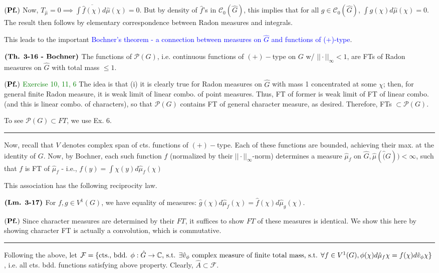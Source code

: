 \documentclass{article}
\begin{document}
$(\textbf{Pf.})$ Now, $T_{\hat{\mu}} = 0 \implies \int \overline{\hat{f}(\chi)} d\hat{\mu}(\chi) = 0$. But by density of $\hat{f}$'s in $\mathcal{C}_0{(\hat{G})}$, this implies that for all $g \in \mathcal{C}_0{(\hat{G})}$, $\int g(\chi) d\hat{\mu}(\chi) = 0$. The result then follows by elementary correspondence between Radon measures and integrals.

This leads to the important \textcolor{blue}{Bochner's theorem - a connection between measures on $\hat{G}$ and functions of (+)-type}.

$\textbf{(Th. 3-16 - Bochner)}$ The functions of $\mathcal{P}(G)$, i.e. continuous functions of $(+)-$type on $G$ w/ $||\cdot||_{\infty} < 1$,  are FTs of Radon measures on $\hat{G}$ with total mass $\leq 1$.

$(\textbf{Pf.})$ \textcolor{green}{Exercise 10, 11, 6} The idea is that (i) it is clearly true for Radon measures on $\hat{G}$ with mass 1 concentrated at some $\chi$; then, for general finite Radon measure, it is weak limit of linear combo. of point measures. Thus, FT of former is weak limit of FT of linear combo. (and this is linear combo. of characters), so that $\mathcal{P}(G)$ contains FT of general character measure, as desired. Therefore, FTs $\subset \mathcal{P}(G)$.

To see $\mathcal{P}(G) \subset FT$, we use Ex. 6.

\noindent\rule{17cm}{0.4pt}

Now, recall that $V$ denotes complex span of cts. functions of $(+)-$type. Each of these functions are bounded, achieving their max. at the identity of $G$. Now, by Bochner, each such function $f$ (normalized by their $||\cdot||_{\infty}$-norm) determines a measure $\hat{\mu}_f$ on $\hat{G}, \hat{\mu}(\hat(G)) < \infty$, such that $f$ is FT of $\hat{\mu}_f$ - i.e., $f(y) = \int \chi(y)d\hat{\mu}_f(\chi)$

This association has the following reciprocity law.

$\textbf{(Lm. 3-17)}$ For $f,g \in V^1(G)$, we have equality of measures: $\hat{g}(\chi)d\hat{\mu}_f(\chi) = \hat{f}(\chi)d\hat{\mu}_g(\chi)$.

$(\textbf{Pf.})$ Since character measures are determined by their $FT$, it suffices to show $FT$ of these measures is identical. We show this here by showing character FT is actually a convolution, which is commutative.

\noindent\rule{17cm}{0.4pt}

Following the above, let $\mathcal{F} = \{ \text{cts., bdd. } \phi: \hat{G} \rightarrow \mathbb{C} \text{, s.t. } \exists \hat{v}_{\phi} \text{ complex measure of finite total mass, s.t. }\forall f \in V^1(G), \phi(\chi)d\hat{\mu}_f{\chi} = f(\chi)d\hat{v}_{\phi}{\chi} \}$, i.e. all cts. bdd. functions satisfying above property. Clearly, $\hat{A} \subset \mathcal{F}$.
\end{document}
